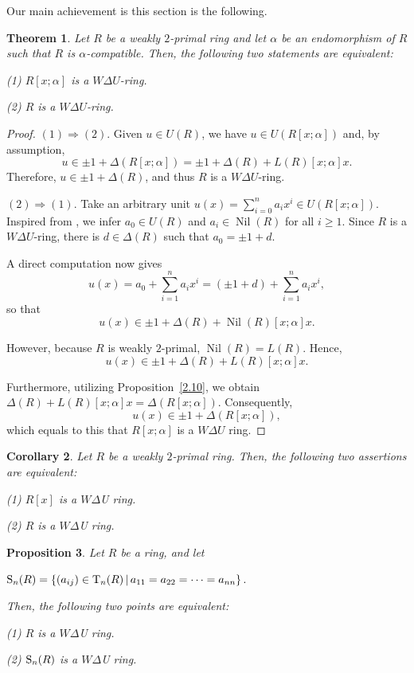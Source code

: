 \documentclass[12pt]{amsart}
\newtheorem{theorem}{Theorem}[section]
\newtheorem{proposition}[theorem]{Proposition}
\newtheorem{corollary}[theorem]{Corollary}
\theoremstyle{definition}
\begin{document}
Our main achievement is this section is the following.

\begin{theorem}\label{3.29}
Let $R$ be a weakly $2$-primal ring and let $\alpha$ be an endomorphism of $R$ such that $R$ is $\alpha$-compatible. Then, the following two statements are equivalent:

(1) $R[x;\alpha]$ is a $W\Delta U$-ring.

(2) $R$ is a $W\Delta U$-ring.
\end{theorem}

\begin{proof}
$(1) \Rightarrow (2)$. Given $u\in U(R)$, we have $u\in U(R[x;\alpha])$ and, by
assumption,
\[
u\in \pm1+\Delta(R[x;\alpha])
=\pm1+\Delta(R)+L(R)[x; \alpha]x.
\]
Therefore, $u\in \pm1+\Delta(R)$, and thus $R$ is a $W\Delta U$-ring.

$(2) \Rightarrow(1) $. Take an arbitrary unit \(u(x) = \sum_{i=0}^n a_i x^i \in U(R[x;\alpha])\). Inspired from \cite[Corollary~2.14]{15}, we infer \(a_0 \in U(R)\) and \(a_i \in \operatorname{Nil}(R)\) for all \(i \ge 1\). Since \(R\) is a \(W\Delta U\)-ring, there is \(d \in \Delta(R)\) such that \(a_0 = \pm 1 + d\).

A direct computation now gives
\[
u(x) = a_0 + \sum_{i=1}^n a_i x^i = (\pm 1 + d) + \sum_{i=1}^n a_i x^i,
\]
so that
\[
u(x) \in \pm 1 + \Delta(R) + \operatorname{Nil}(R)[x;\alpha]x.
\]

However, because \(R\) is weakly \(2\)-primal, \(\operatorname{Nil}(R) = L(R)\). Hence,
\[
u(x) \in \pm 1 + \Delta(R) + L(R)[x;\alpha]x.
\]

Furthermore, utilizing Proposition~\ref{2.10}, we obtain \(\Delta(R) + L(R)[x;\alpha]x = \Delta(R[x;\alpha])\). Consequently,
\[
u(x) \in \pm 1 + \Delta(R[x;\alpha]),
\]
which equals to this that \(R[x;\alpha]\) is a \(W\Delta U\) ring.
\end{proof}

\begin{corollary}\label{3.30}
Let \( R \) be a weakly \(2\)-primal ring. Then, the following two assertions are equivalent:

(1) \( R[x] \) is a $W\Delta$U ring.

(2) \( R \) is a $W\Delta$U ring.
\end{corollary}

\begin{proposition}\label{3}
Let $R$ be a ring, and let
\begin{center}
		${\rm S}_{n}(R)=\left\lbrace (a_{ij})\in {\rm T}_{n}(R)\, | \, a_{11}=a_{22}=\cdots=a_{nn}\right\rbrace.$
\end{center}
Then, the following two points are equivalent:
	
(1) $R$ is a $W\Delta$U ring.
	
(2) ${\rm S}_{n}(R)$ is a $W\Delta$U ring.
\end{proposition}
\end{document}
